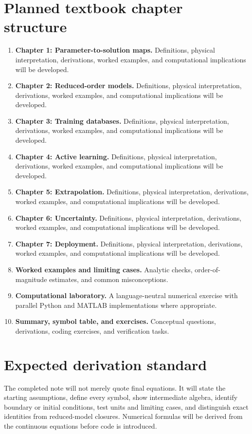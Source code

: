 \documentclass[11pt]{article}
\begin{document}
\section{Planned textbook chapter structure}
\begin{enumerate}[leftmargin=1.8em]
\item \textbf{Chapter 1: Parameter-to-solution maps.} Definitions, physical interpretation, derivations, worked examples, and computational implications will be developed.
\item \textbf{Chapter 2: Reduced-order models.} Definitions, physical interpretation, derivations, worked examples, and computational implications will be developed.
\item \textbf{Chapter 3: Training databases.} Definitions, physical interpretation, derivations, worked examples, and computational implications will be developed.
\item \textbf{Chapter 4: Active learning.} Definitions, physical interpretation, derivations, worked examples, and computational implications will be developed.
\item \textbf{Chapter 5: Extrapolation.} Definitions, physical interpretation, derivations, worked examples, and computational implications will be developed.
\item \textbf{Chapter 6: Uncertainty.} Definitions, physical interpretation, derivations, worked examples, and computational implications will be developed.
\item \textbf{Chapter 7: Deployment.} Definitions, physical interpretation, derivations, worked examples, and computational implications will be developed.
\item \textbf{Worked examples and limiting cases.} Analytic checks, order-of-magnitude estimates, and common misconceptions.
\item \textbf{Computational laboratory.} A language-neutral numerical exercise with parallel Python and MATLAB implementations where appropriate.
\item \textbf{Summary, symbol table, and exercises.} Conceptual questions, derivations, coding exercises, and verification tasks.
\end{enumerate}

\section{Expected derivation standard}
The completed note will not merely quote final equations. It will state the starting assumptions, define every symbol, show intermediate algebra, identify boundary or initial conditions, test units and limiting cases, and distinguish exact identities from reduced-model closures. Numerical formulas will be derived from the continuous equations before code is introduced.
\end{document}
